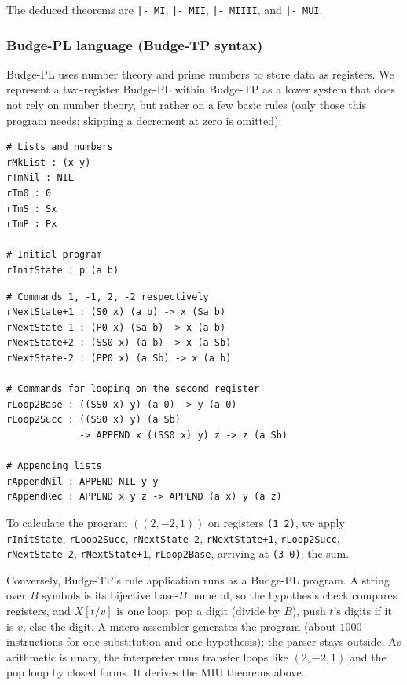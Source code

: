\documentclass{article}
\begin{document}
The deduced theorems are \texttt{|- MI}, \texttt{|- MII}, \texttt{|- MIIII}, and \texttt{|- MUI}.

\subsubsection{Budge-PL language (Budge-TP syntax)}

Budge-PL uses number theory and prime numbers to store data as registers. We represent a two-register Budge-PL within Budge-TP as a lower system that does not rely on number theory, but rather on a few basic rules (only those this program needs; skipping a decrement at zero is omitted):

\begin{minipage}{0.40\textwidth}
\begin{verbatim}
# Lists and numbers
rMkList : (x y)
rTmNil : NIL
rTm0 : 0
rTmS : Sx
rTmP : Px

# Initial program
rInitState : p (a b)
\end{verbatim}
\end{minipage}
\begin{minipage}{0.58\textwidth}
\begin{verbatim}
# Commands 1, -1, 2, -2 respectively
rNextState+1 : (S0 x) (a b) -> x (Sa b)
rNextState-1 : (P0 x) (Sa b) -> x (a b)
rNextState+2 : (SS0 x) (a b) -> x (a Sb)
rNextState-2 : (PP0 x) (a Sb) -> x (a b)

# Commands for looping on the second register
rLoop2Base : ((SS0 x) y) (a 0) -> y (a 0)
rLoop2Succ : ((SS0 x) y) (a Sb)
             -> APPEND x ((SS0 x) y) z -> z (a Sb)

# Appending lists
rAppendNil : APPEND NIL y y
rAppendRec : APPEND x y z -> APPEND (a x) y (a z)
\end{verbatim}
\end{minipage}

To calculate the program $((2, -2, 1))$ on registers \texttt{(1 2)}, we apply \texttt{rInitState}, \texttt{rLoop2Succ}, \texttt{rNextState-2}, \texttt{rNextState+1}, \texttt{rLoop2Succ}, \texttt{rNextState-2}, \texttt{rNextState+1}, \texttt{rLoop2Base}, arriving at \texttt{(3 0)}, the sum.

Conversely, Budge-TP's rule application runs as a Budge-PL program. A string over $B$ symbols is its bijective base-$B$ numeral, so the hypothesis check compares registers, and $X[t/v]$ is one loop: pop a digit (divide by $B$), push $t$'s digits if it is $v$, else the digit. A macro assembler generates the program (about $1000$ instructions for one substitution and one hypothesis); the parser stays outside. As arithmetic is unary, the interpreter runs transfer loops like $(2, -2, 1)$ and the pop loop by closed forms. It derives the MIU theorems above\cite{b7}.
\end{document}

